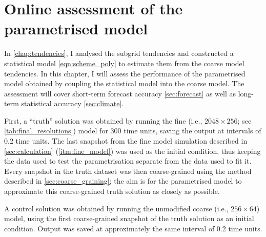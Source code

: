 \documentclass[../main.tex]{subfiles}
\begin{document}
\ifSubfilesClassLoaded{
    \frontmatter
    \tableofcontents
    \mainmatter
}{}

\chapter{Online assessment of the parametrised model} \label{chap:evaluation}
\setlength{\epigraphwidth}{0.5\linewidth}

In \cref{chap:tendencies}, I analysed the subgrid tendencies and
constructed a statistical model \cref{eqn:scheme_poly} to estimate
them from the coarse model tendencies. In this chapter, I will assess
the performance of the parametrised model obtained by coupling the
statistical model into the coarse \rb{} model. The assessment will cover
short-term forecast accuracy \cref{sec:forecast} as well as long-term
statistical accuracy \cref{sec:climate}.

First, a ``truth'' solution was obtained by running the fine (i.e., $2048
\times 256$; see \cref{tab:final_resolutions}) model for 300 time units,
saving the output at intervals of 0.2 time units. The last snapshot from the
fine model simulation described in \cref{sec:calculation}
(\cref{itm:fine_model}) was used as the initial condition, thus keeping
the data used to test the parametrisation separate from the data used to fit
it. Every snapshot in the truth dataset was then coarse-grained using the
method described in \cref{sec:coarse_graining}; the aim is for the
parametrised model to approximate this coarse-grained truth solution as closely
as possible.

A control solution was obtained by running the unmodified coarse (i.e., $256
\times 64$) model, using the first coarse-grained snapshot of the truth
solution as an initial condition. Output was saved at approximately the
same interval of 0.2 time units.
\end{document}
